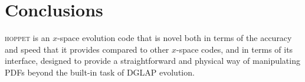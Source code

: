 \documentclass[12pt]{article}
\newcommand{\hoppet}{\textsc{hoppet}\xspace}
\begin{document}


\section{Conclusions}

\hoppet is an $x$-space evolution code that is novel both in terms of
the accuracy and speed that it provides compared to other $x$-space
codes, and in terms of its interface, designed to provide a
straightforward and physical way of manipulating PDFs beyond the
built-in task of DGLAP evolution.
\end{document}
